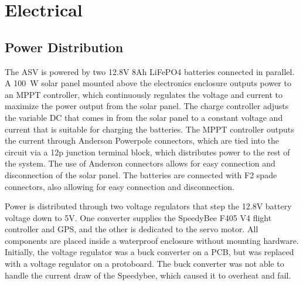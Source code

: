 \section{Electrical}

\subsection{Power Distribution}
The ASV is powered by two 12.8V 8Ah LiFePO4 batteries connected in parallel. A \SI{100}{\watt} solar panel mounted above the electronics enclosure outputs power to an MPPT controller, which continuously regulates the voltage and current to maximize the power output from the solar panel. The charge controller adjusts the variable DC that comes in from the solar panel to a constant voltage and current that is suitable for charging the batteries. The MPPT controller outputs the current through Anderson Powerpole connectors, which are tied into the circuit via a 12p junction terminal block, which distributes power to the rest of the system. The use of Anderson connectors allows for easy connection and disconnection of the solar panel. The batteries are connected with F2 spade connectors, also allowing for easy connection and disconnection.

Power is distributed through two voltage regulators that step the 12.8V battery voltage down to 5V. One converter supplies the SpeedyBee F405 V4 flight controller and GPS, and the other is dedicated to the servo motor. All components are placed inside a waterproof enclosure without mounting hardware. Initially, the voltage regulator was a buck converter on a PCB, but was replaced with a voltage regulator on a protoboard. The buck converter was not able to handle the current draw of the Speedybee, which caused it to overheat and fail. 


